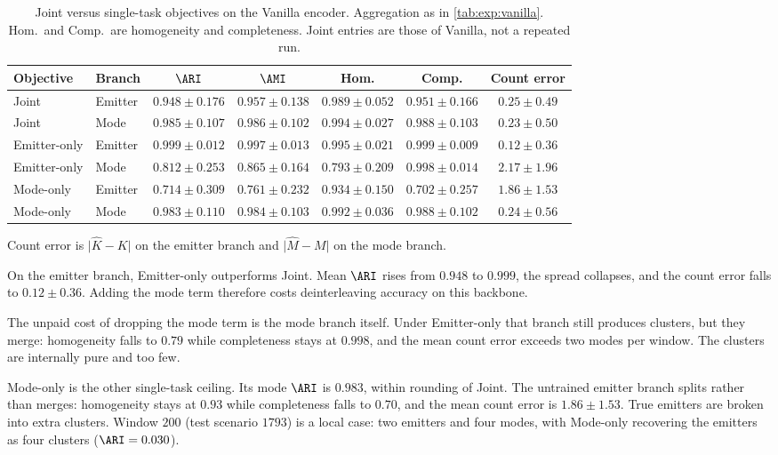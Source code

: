 \begin{table}[tbp]
  \centering
  \caption{Joint versus single-task objectives on the Vanilla encoder. Aggregation as in \cref{tab:exp:vanilla}. Hom.\ and Comp.\ are homogeneity and completeness. Joint entries are those of Vanilla, not a repeated run.}
  \label{tab:exp:ablation_loss}
  \small
  \begin{tabular}{@{}llccccc@{}}
    \toprule
    Objective & Branch & $\ARI$ & $\AMI$ & Hom. & Comp. & Count error \\
    \midrule
    Joint         & Emitter & $0.948\pm0.176$ & $0.957\pm0.138$ & $0.989\pm0.052$ & $0.951\pm0.166$ & $0.25\pm0.49$ \\
    Joint         & Mode    & $0.985\pm0.107$ & $0.986\pm0.102$ & $0.994\pm0.027$ & $0.988\pm0.103$ & $0.23\pm0.50$ \\
    Emitter-only  & Emitter & $0.999\pm0.012$ & $0.997\pm0.013$ & $0.995\pm0.021$ & $0.999\pm0.009$ & $0.12\pm0.36$ \\
    Emitter-only  & Mode    & $0.812\pm0.253$ & $0.865\pm0.164$ & $0.793\pm0.209$ & $0.998\pm0.014$ & $2.17\pm1.96$ \\
    Mode-only     & Emitter & $0.714\pm0.309$ & $0.761\pm0.232$ & $0.934\pm0.150$ & $0.702\pm0.257$ & $1.86\pm1.53$ \\
    Mode-only     & Mode    & $0.983\pm0.110$ & $0.984\pm0.103$ & $0.992\pm0.036$ & $0.988\pm0.102$ & $0.24\pm0.56$ \\
    \bottomrule
  \end{tabular}
\end{table}

Count error is $\lvert\hat{K}-K\rvert$ on the emitter branch and $\lvert\hat{M}-M\rvert$ on the mode branch.

On the emitter branch, Emitter-only outperforms Joint.
Mean $\ARI$ rises from $0.948$ to $0.999$, the spread collapses, and the count error falls to $0.12\pm0.36$.
Adding the mode term therefore costs deinterleaving accuracy on this backbone.

The unpaid cost of dropping the mode term is the mode branch itself.
Under Emitter-only that branch still produces clusters, but they merge: homogeneity falls to $0.79$ while completeness stays at $0.998$, and the mean count error exceeds two modes per window.
The clusters are internally pure and too few.

Mode-only is the other single-task ceiling.
Its mode $\ARI$ is $0.983$, within rounding of Joint.
The untrained emitter branch splits rather than merges: homogeneity stays at $0.93$ while completeness falls to $0.70$, and the mean count error is $1.86\pm1.53$.
True emitters are broken into extra clusters.
Window $200$ (test scenario $1793$) is a local case: two emitters and four modes, with Mode-only recovering the emitters as four clusters ($\ARI=0.030$).

